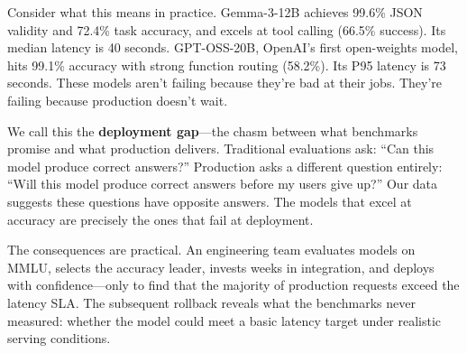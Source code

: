 \documentclass[11pt]{article}
\begin{document}
Consider what this means in practice. Gemma-3-12B achieves 99.6\% JSON validity and 72.4\% task accuracy, and excels at tool calling (66.5\% success). Its median latency is 40 seconds. GPT-OSS-20B, OpenAI's first open-weights model, hits 99.1\% accuracy with strong function routing (58.2\%). Its P95 latency is 73 seconds. These models aren't failing because they're bad at their jobs. They're failing because production doesn't wait.

We call this the \textbf{deployment gap}---the chasm between what benchmarks promise and what production delivers. Traditional evaluations ask: ``Can this model produce correct answers?'' Production asks a different question entirely: ``Will this model produce correct answers before my users give up?'' Our data suggests these questions have opposite answers. The models that excel at accuracy are precisely the ones that fail at deployment.

The consequences are practical. An engineering team evaluates models on MMLU, selects the accuracy leader, invests weeks in integration, and deploys with confidence---only to find that the majority of production requests exceed the latency SLA. The subsequent rollback reveals what the benchmarks never measured: whether the model could meet a basic latency target under realistic serving conditions.
\end{document}
